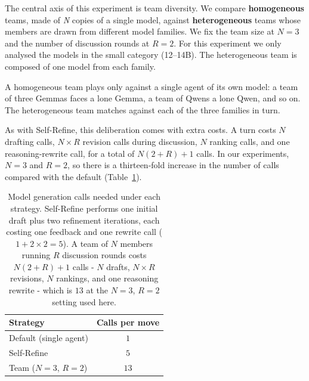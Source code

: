 The central axis of this experiment is team diversity. We compare \textbf{homogeneous} teams, made of \textit{N} copies of a single model, against \textbf{heterogeneous} teams whose members are drawn from different model families. We fix the team size at $N = 3$ and the number of discussion rounds at $R = 2$. For this experiment we only analysed the models in the small category (12--14B). The heterogeneous team is composed of one model from each family.  

A homogeneous team plays only against a single agent of its own model: a team of three Gemmas faces a lone Gemma, a team of Qwens a lone Qwen, and so on. The heterogeneous team matches against each of the three families in turn.

As with Self-Refine, this deliberation comes with extra costs. A turn costs $N$ drafting calls, $N \times R$ revision calls during discussion, $N$ ranking calls, and one reasoning-rewrite call, for a total of $N(2+R)+1$ calls. In our experiments, $N = 3$ and $R = 2$, so there is a thirteen-fold increase in the number of calls compared with the default (Table~\ref{tab:inference-cost}). 


\begin{table}
\centering
\small
\caption{Model generation calls needed under each strategy. Self-Refine performs one initial draft plus two refinement iterations, each costing one feedback and one rewrite call ($1+2\times2=5$). A team of $N$ members running $R$ discussion rounds costs $N(2+R)+1$ calls - $N$ drafts, $N\times R$ revisions, $N$ rankings, and one reasoning rewrite - which is $13$ at the $N=3$, $R=2$ setting used here.}
\label{tab:inference-cost}
\begin{tabular}{lc}
\toprule
\textbf{Strategy} & \textbf{Calls per move} \\
\midrule
Default (single agent)         & $1$ \\
Self-Refine                    & $5$ \\
Team ($N{=}3$, $R{=}2$)        & $13$ \\
\bottomrule
\end{tabular}
\end{table}
